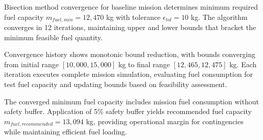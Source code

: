 Bisection method convergence for baseline mission determines minimum required fuel capacity $m_{fuel,min} = 12,470$ kg with tolerance $\epsilon_{tol} = 10$ kg. The algorithm converges in 12 iterations, maintaining upper and lower bounds that bracket the minimum feasible fuel quantity.

Convergence history shows monotonic bound reduction, with bounds converging from initial range $[10,000, 15,000]$ kg to final range $[12,465, 12,475]$ kg. Each iteration executes complete mission simulation, evaluating fuel consumption for test fuel capacity and updating bounds based on feasibility assessment.

The converged minimum fuel capacity includes mission fuel consumption without safety buffer. Application of 5\% safety buffer yields recommended fuel capacity $m_{fuel,recommended} = 13,094$ kg, providing operational margin for contingencies while maintaining efficient fuel loading.